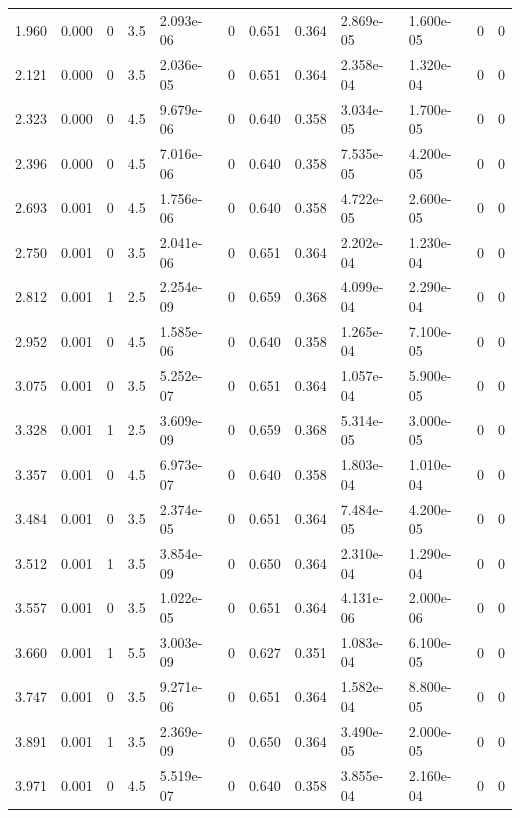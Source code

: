 \documentclass[preview]{standalone}
\begin{document}
{{\begin{tabular}{L{1.2cm}C{1.2cm} C{0.3cm}C{0.5cm} C{1.4cm}C{1.4cm} C{1.4cm}C{1.4cm} C{1.6cm}C{1.6cm} C{1.6cm}C{1.6cm}}
  1.960  &  0.000  & 0     & 3.5 &  2.093e-06  & 0  &  0.651&   0.364& 2.869e-05 & 1.600e-05   &  0 & 0  \\ 
  2.121  &  0.000  & 0     & 3.5 &  2.036e-05  & 0  &  0.651&   0.364& 2.358e-04 & 1.320e-04   &  0 & 0  \\ 
  2.323  &  0.000  & 0     & 4.5 &  9.679e-06  & 0  &  0.640&   0.358& 3.034e-05 & 1.700e-05   &  0 & 0  \\ 
  2.396  &  0.000  & 0     & 4.5 &  7.016e-06  & 0  &  0.640&   0.358& 7.535e-05 & 4.200e-05   &  0 & 0  \\ 
  2.693  &  0.001  & 0     & 4.5 &  1.756e-06  & 0  &  0.640&   0.358& 4.722e-05 & 2.600e-05   &  0 & 0  \\ 
  2.750  &  0.001  & 0     & 3.5 &  2.041e-06  & 0  &  0.651&   0.364& 2.202e-04 & 1.230e-04   &  0 & 0  \\ 
  2.812  &  0.001  & 1     & 2.5 &  2.254e-09  & 0  &  0.659&   0.368& 4.099e-04 & 2.290e-04   &  0 & 0  \\ 
  2.952  &  0.001  & 0     & 4.5 &  1.585e-06  & 0  &  0.640&   0.358& 1.265e-04 & 7.100e-05   &  0 & 0  \\ 
  3.075  &  0.001  & 0     & 3.5 &  5.252e-07  & 0  &  0.651&   0.364& 1.057e-04 & 5.900e-05   &  0 & 0  \\ 
  3.328  &  0.001  & 1     & 2.5 &  3.609e-09  & 0  &  0.659&   0.368& 5.314e-05 & 3.000e-05   &  0 & 0  \\ 
  3.357  &  0.001  & 0     & 4.5 &  6.973e-07  & 0  &  0.640&   0.358& 1.803e-04 & 1.010e-04   &  0 & 0  \\ 
  3.484  &  0.001  & 0     & 3.5 &  2.374e-05  & 0  &  0.651&   0.364& 7.484e-05 & 4.200e-05   &  0 & 0  \\ 
  3.512  &  0.001  & 1     & 3.5 &  3.854e-09  & 0  &  0.650&   0.364& 2.310e-04 & 1.290e-04   &  0 & 0  \\ 
  3.557  &  0.001  & 0     & 3.5 &  1.022e-05  & 0  &  0.651&   0.364& 4.131e-06 & 2.000e-06   &  0 & 0  \\ 
  3.660  &  0.001  & 1     & 5.5 &  3.003e-09  & 0  &  0.627&   0.351& 1.083e-04 & 6.100e-05   &  0 & 0  \\ 
  3.747  &  0.001  & 0     & 3.5 &  9.271e-06  & 0  &  0.651&   0.364& 1.582e-04 & 8.800e-05   &  0 & 0  \\ 
  3.891  &  0.001  & 1     & 3.5 &  2.369e-09  & 0  &  0.650&   0.364& 3.490e-05 & 2.000e-05   &  0 & 0  \\ 
  3.971  &  0.001  & 0     & 4.5 &  5.519e-07  & 0  &  0.640&   0.358& 3.855e-04 & 2.160e-04   &  0 & 0  \\ 

\end{tabular}}}
\end{document}
